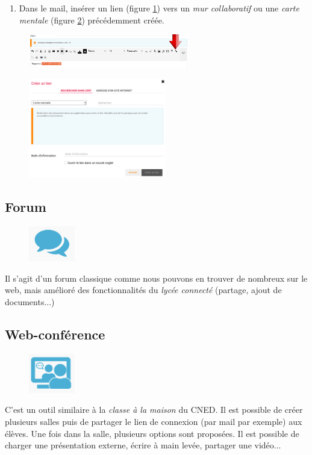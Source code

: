 \documentclass[a4paper,11pt]{article}
\begin{document}
\begin{Form}
\begin{activite}
\begin{enumerate}
\item Dans le mail, insérer un lien (figure \ref{lien1}) vers un \emph{mur collaboratif} ou une \emph{carte mentale} (figure \ref{lien2}) précédemment créée.
\end{enumerate}
\end{activite}
\begin{figure}[!h]
\centering
\includegraphics[width=7cm]{ressources/lienmail1.png}
\label{lien1}
\end{figure}
\begin{figure}[!h]
\centering
\includegraphics[width=6cm]{ressources/lienmail2.png}
\label{lien2}
\end{figure}
\subsection{Forum}
\begin{figure}[!h]
\centering
\includegraphics[width=2cm]{ressources/forum.png}
\label{forum}
\end{figure}
Il s'agit d'un forum classique comme nous pouvons en trouver de nombreux sur le web, mais amélioré des fonctionnalités du \emph{lycée connecté} (partage, ajout de documents...)
\subsection{Web-conférence}
\begin{figure}[!h]
\centering
\includegraphics[width=2cm]{ressources/webconf.png}
\label{webconf}
\end{figure}
C'est un outil similaire à la \emph{classe à la maison} du CNED. Il est possible de créer plusieurs salles puis de partager le lien de connexion (par mail par exemple) aux élèves.
Une fois dans la salle, plusieurs options sont proposées. Il est possible de charger une présentation externe, écrire à main levée, partager une vidéo... 

\end{Form}
\end{document}
